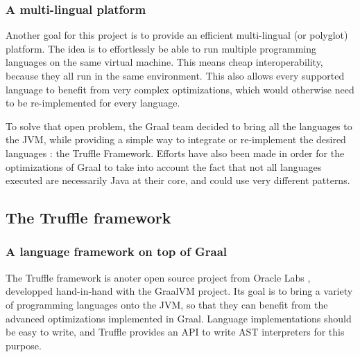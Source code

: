 \documentclass[twoside,11pt,a4paper]{article}
\begin{document}
\subsubsection{A multi-lingual platform}

Another goal for this project is to provide an efficient multi-lingual (or polyglot) platform. The idea is to effortlessly be able to run multiple programming languages on the same virtual machine. This means cheap interoperability, because they all run in the same environment. This also allows every supported language to benefit from very complex optimizations, which would otherwise need to be re-implemented for every language.

To solve that open problem, the Graal team decided to bring all the languages to the JVM, while providing a simple way to integrate or re-implement the desired languages : the Truffle Framework. Efforts have also been made in order for the optimizations of Graal to take into account the fact that not all languages executed are necessarily Java at their core, and could use very different patterns.

\subsection{The Truffle framework}

\subsubsection{A language framework on top of Graal}


The Truffle framework is anoter open source project from Oracle Labs \cite{trufflerepo}, developped hand-in-hand with the GraalVM project. Its goal is to bring a variety of programming languages onto the JVM, so that they can benefit from the advanced optimizations implemented in Graal. Language implementations should be easy to write, and Truffle provides an API to write AST interpreters for this purpose.
\end{document}
